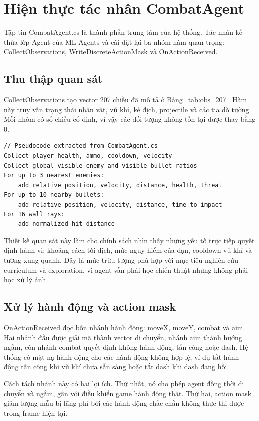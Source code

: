 \section{Hiện thực tác nhân CombatAgent}

Tập tin CombatAgent.cs là thành phần trung tâm của hệ thống. Tác nhân kế thừa lớp Agent của ML-Agents và cài đặt lại ba nhóm hàm quan trọng: CollectObservations, WriteDiscreteActionMask và OnActionReceived.

\subsection{Thu thập quan sát}

CollectObservations tạo vector 207 chiều đã mô tả ở Bảng~\ref{tab:obs_207}. Hàm này truy vấn trạng thái nhân vật, vũ khí, kẻ địch, projectile và các tia dò tường. Mỗi nhóm có số chiều cố định, vì vậy các đối tượng không tồn tại được thay bằng 0.

\begin{lstlisting}
// Pseudocode extracted from CombatAgent.cs
Collect player health, ammo, cooldown, velocity
Collect global visible-enemy and visible-bullet ratios
For up to 3 nearest enemies:
    add relative position, velocity, distance, health, threat
For up to 10 nearby bullets:
    add relative position, velocity, distance, time-to-impact
For 16 wall rays:
    add normalized hit distance
\end{lstlisting}

Thiết kế quan sát này làm cho chính sách nhìn thấy những yếu tố trực tiếp quyết định hành vi: khoảng cách tới địch, mức nguy hiểm của đạn, cooldown vũ khí và tường xung quanh. Đây là mức trừu tượng phù hợp với mục tiêu nghiên cứu curriculum và exploration, vì agent vẫn phải học chiến thuật nhưng không phải học xử lý ảnh.

\subsection{Xử lý hành động và action mask}

OnActionReceived đọc bốn nhánh hành động: moveX, moveY, combat và aim. Hai nhánh đầu được giải mã thành vector di chuyển, nhánh aim thành hướng ngắm, còn nhánh combat quyết định không hành động, tấn công hoặc dash. Hệ thống có mặt nạ hành động cho các hành động không hợp lệ, ví dụ tắt hành động tấn công khi vũ khí chưa sẵn sàng hoặc tắt dash khi dash đang hồi.

Cách tách nhánh này có hai lợi ích. Thứ nhất, nó cho phép agent đồng thời di chuyển và ngắm, gần với điều khiển game hành động thật. Thứ hai, action mask giảm lượng mẫu bị lãng phí bởi các hành động chắc chắn không thực thi được trong frame hiện tại.

